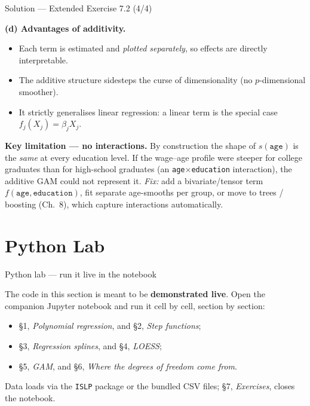\documentclass[aspectratio=169,11pt]{beamer}
\begin{document}
\begin{frame}{Solution --- Extended Exercise 7.2 (4/4)}
\begin{solutionbox}
\textbf{(d) Advantages of additivity.}
\begin{itemize}
  \item Each term is estimated and \emph{plotted separately}, so effects are directly interpretable.
  \item The additive structure sidesteps the curse of dimensionality (no $p$-dimensional smoother).
  \item It strictly generalises linear regression: a linear term is the special case $f_j(X_j)=\beta_j X_j$.
\end{itemize}

\textbf{Key limitation --- no interactions.} By construction the shape of $s(\texttt{age})$ is the \emph{same} at every education level. If the wage--age profile were steeper for college graduates than for high-school graduates (an \texttt{age}$\times$\texttt{education} interaction), the additive GAM could not represent it. \emph{Fix:} add a bivariate/tensor term $f(\texttt{age},\texttt{education})$, fit separate age-smooths per group, or move to trees / boosting (Ch.~8), which capture interactions automatically.
\end{solutionbox}
\end{frame}


\section{Python Lab}

\begin{frame}{Python lab --- run it live in the notebook}
  \begin{labnote}
    The code in this section is meant to be \textbf{demonstrated live}. Open the companion Jupyter notebook and run it cell by cell, section by section:
    \begin{itemize}
      \item \S1, \emph{Polynomial regression}, and \S2, \emph{Step functions};
      \item \S3, \emph{Regression splines}, and \S4, \emph{LOESS};
      \item \S5, \emph{GAM}, and \S6, \emph{Where the degrees of freedom come from}.
    \end{itemize}
    Data loads via the \texttt{ISLP} package or the bundled CSV files; \S7, \emph{Exercises}, closes the notebook.
  \end{labnote}
\end{frame}
\end{document}
